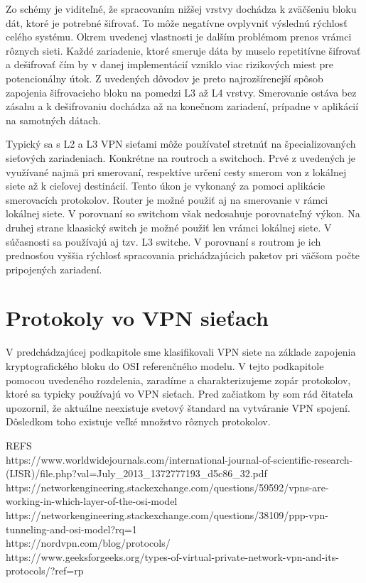 Zo schémy je viditeľné, že spracovaním nižšej vrstvy dochádza k zväčšeniu bloku dát, ktoré je potrebné šifrovať. To môže negatívne ovplyvniť výslednú rýchlosť celého systému. Okrem uvedenej vlastnosti je dalším problémom prenos vrámci rôznych sieti. Každé zariadenie, ktoré smeruje dáta by muselo repetitívne šifrovať a dešifrovať čím by v danej implementácií vzniklo viac rizikových miest pre potencionálny útok. Z uvedených dôvodov je preto najrozšírenejší spôsob zapojenia šifrovacieho bloku na pomedzi L3 až L4 vrstvy. Smerovanie ostáva bez zásahu a k dešifrovaniu dochádza až na konečnom zariadení, prípadne v aplikácií na samotných dátach.

Typický sa s L2 a L3 VPN sieťami môže používateľ stretnúť na špecializovaných sieťových zariadeniach. Konkrétne na routroch a switchoch. Prvé z uvedených je využívané najmä pri smerovaní, respektíve určení cesty smerom von z lokálnej siete až k cieľovej destinácií. Tento úkon je vykonaný za pomoci aplikácie smerovacích protokolov. Router je možné použiť aj na smerovanie v rámci lokálnej siete. V porovnaní so switchom však nedosahuje porovnateľný výkon. Na druhej strane klaasický switch je možné použiť len vrámci lokálnej siete. V súčasnosti sa používajú aj tzv. L3 switche. V porovnaní s routrom je ich prednosťou vyššia rýchlosť spracovania prichádzajúcich paketov pri väčšom počte pripojených zariadení.        

\section{Protokoly vo VPN sieťach} 
V predchádzajúcej podkapitole sme klasifikovali VPN siete na základe zapojenia kryptografického bloku do OSI referenčného modelu. V tejto podkapitole pomocou uvedeného rozdelenia, zaradíme a charakterizujeme zopár protokolov, ktoré sa typicky používajú vo VPN sieťach. Pred začiatkom by som rád čitateľa upozornil, že aktuálne neexistuje svetový štandard na vytváranie VPN spojení. Dôsledkom toho existuje veľké množstvo rôznych protokolov. 

REFS\\
https://www.worldwidejournals.com/international-journal-of-scientific-research-(IJSR)/file.php?val=July\_2013\_1372777193\_d5c86\_32.pdf  \\
https://networkengineering.stackexchange.com/questions/59592/vpns-are-working-in-which-layer-of-the-osi-model\\
https://networkengineering.stackexchange.com/questions/38109/ppp-vpn-tunneling-and-osi-model?rq=1\\
https://nordvpn.com/blog/protocols/\\
https://www.geeksforgeeks.org/types-of-virtual-private-network-vpn-and-its-protocols/?ref=rp\\

